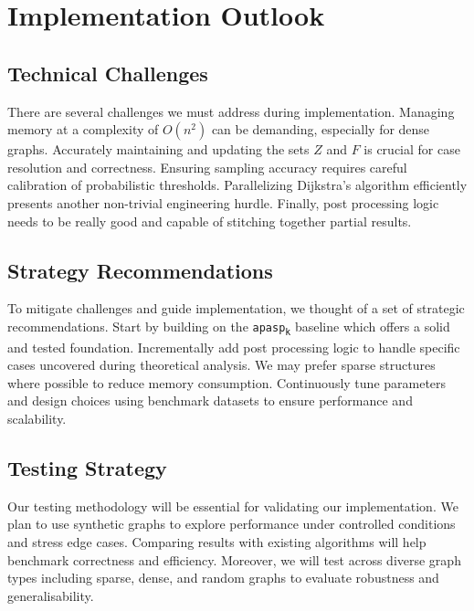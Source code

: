 \documentclass[a4paper,11pt,oneside]{book}
\begin{document}
\section*{Implementation Outlook}

\subsection*{Technical Challenges}
There are several challenges we must address during implementation. Managing memory at a complexity of $O(n^2)$ can be demanding, especially for dense graphs. Accurately maintaining and updating the sets $Z$ and $F$ is crucial for case resolution and correctness. Ensuring sampling accuracy requires careful calibration of probabilistic thresholds. Parallelizing Dijkstra's algorithm efficiently presents another non-trivial engineering hurdle. Finally, post processing logic needs to be really good and capable of stitching together partial results.

\subsection*{Strategy Recommendations}
To mitigate challenges and guide implementation, we thought of a set of strategic recommendations. Start by building on the \texttt{apasp\textsubscript{k}} baseline which offers a solid and tested foundation. Incrementally add post processing logic to handle specific cases uncovered during theoretical analysis. We may prefer sparse structures where possible to reduce memory consumption. Continuously tune parameters and design choices using benchmark datasets to ensure performance and scalability.

\subsection*{Testing Strategy}
Our testing methodology will be essential for validating our implementation. We plan to use synthetic graphs to explore performance under controlled conditions and stress edge cases. Comparing results with existing algorithms will help benchmark correctness and efficiency. Moreover, we will test across diverse graph types including sparse, dense, and random graphs to evaluate robustness and generalisability.
\end{document}
